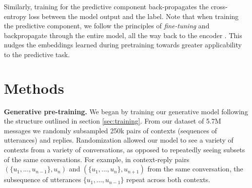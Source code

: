 \documentclass{article}
\newcommand{\fixme}[1]{\textcolor{red}{[FIXME: #1]}}
\begin{document}
Similarly, training for the predictive component back-propagates the cross-entropy loss between the model output and the label. Note that when training the predictive component, we follow the principles of \textit{fine-tuning} and backpropagate through the entire model, all the way back to the encoder \cite{howard2018universal}. This nudges the embeddings learned during pretraining towards greater applicability to the predictive task.









\section{Methods}
\label{sec:methods}




\textbf{Generative pre-training.} We began by training our generative model following the structure outlined in section \ref{sec:training}. From our dataset of 5.7M messages we randomly subsampled 250k pairs of contexts (sequences of utterances) and replies. Randomization allowed our model to see a variety of contexts from a variety of conversations, as opposed to repeatedly seeing subsets of the same conversations. For example, in context-reply pairs $(\{u_1,...,u_{n-1}\}, u_{n})$ and $(\{u_1,...,u_{n}\}, u_{n+1})$ from the same conversation, the subsequence of utterances $\{u_1,...,u_{n-1}\}$ repeat across both contexts.
\end{document}
